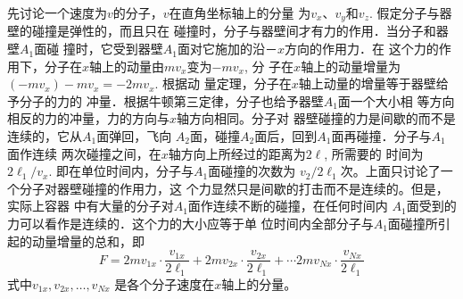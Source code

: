 先讨论一个速度为$v$的分子，$v$在直角坐标轴上的分量
为$v_x$、$v_y$和$v_z$. 假定分子与器壁的碰撞是弹性的，而且只在
碰撞时，分子与器壁间才有力的作用．当分子和器壁$A_1$面碰
撞时，它受到器壁$A_1$面对它施加的沿－$x$方向的作用力．在
这个力的作用下，分子在$x$轴上的动量由$mv_x$变为$-mv_x$, 分
子在$x$轴上的动量增量为$(-mv_x)-mv_x=-2mv_x$. 根据动
量定理，分子在$x$轴上动量的增量等于器壁给予分子的力的
冲量．根据牛顿第三定律，分子也给予器壁$A_1$面一个大小相
等方向相反的力的冲量，力的方向与$x$轴方向相同。分子对
器壁碰撞的力是间歇的而不是连续的，它从$A_1$面弹回，飞向
$A_2$面，碰撞$A_2$面后，回到$A_1$面再碰撞．分子与$A_1$面作连续
两次碰撞之间，在$x$轴方向上所经过的距离为$2\ell$, 所需要的
时间为$2\ell_1/v_x$. 即在单位时间内，分子与$A_1$面碰撞的次数为
$v_2/2\ell_1$次。上面只讨论了一个分子对器壁碰撞的作用力，这
个力显然只是间歇的打击而不是连续的。但是，实际上容器
中有大量的分子对$A_1$面作连续不断的碰撞，在任何时间内
$A_1$面受到的力可以看作是连续的．这个力的大小应等于单
位时间内全部分子与$A_1$面碰撞所引起的动量增量的总和，即
\[F=2mv_{1x}\cdot \frac{v_{1x}}{2\ell_1}+2mv_{2x}\cdot \frac{v_{2x}}{2\ell_1}+\cdots 2mv_{Nx}\cdot \frac{v_{Nx}}{2\ell_1}\]
式中$v_{1x},v_{2x},\ldots,v_{Nx}$
是各个分子速度在$x$轴上的分量。

